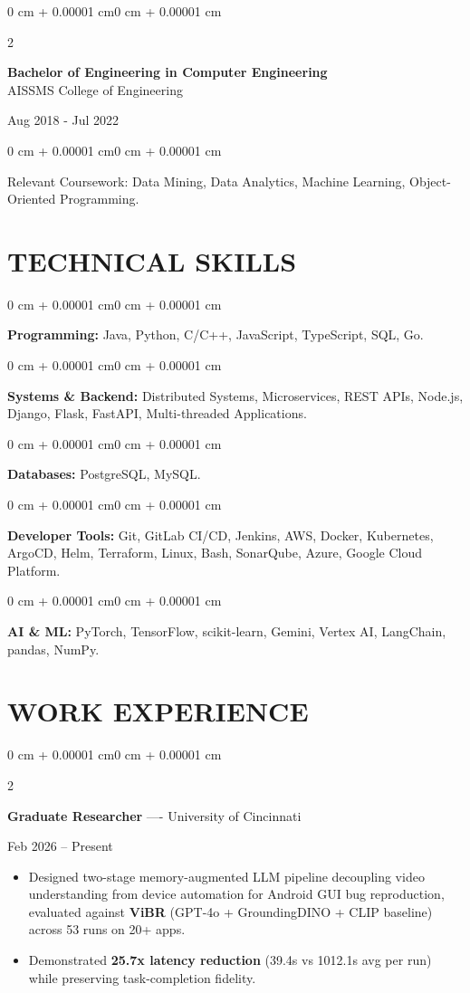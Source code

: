 \documentclass[10pt, letterpaper]{article}
\newenvironment{highlights}{
    \begin{itemize}[
        topsep=0.10 cm,
        parsep=0.06 cm,
        partopsep=0pt,
        itemsep=0.06 cm,
        leftmargin=12pt
    ]
}{
    \end{itemize}
}
\newenvironment{onecolentry}{
    \begin{adjustwidth}{0 cm + 0.00001 cm}{0 cm + 0.00001 cm}
}{
    \end{adjustwidth}
}
\newenvironment{twocolentry}[2][]{
    \onecolentry
    \def\secondColumn{#2}
    \setcolumnwidth{\fill, 4.5 cm}
    \begin{paracol}{2}
}{
    \switchcolumn \raggedleft \secondColumn
    \end{paracol}
    \endonecolentry
}
\begin{document}
\begin{twocolentry}{
    Aug 2018 - Jul 2022
}
    \textbf{Bachelor of Engineering in Computer Engineering} \\
    AISSMS College of Engineering
\end{twocolentry}
\begin{onecolentry}
Relevant Coursework: Data Mining, Data Analytics, Machine Learning, Object-Oriented Programming.
\end{onecolentry}
\section{TECHNICAL SKILLS}
\begin{onecolentry}
\textbf{Programming:} Java, Python, C/C++, JavaScript, TypeScript, SQL, Go.
\end{onecolentry}
\vspace{0.06 cm}
\begin{onecolentry}
\textbf{Systems \& Backend:} Distributed Systems, Microservices, REST APIs, Node.js, Django, Flask, FastAPI, Multi-threaded Applications.
\end{onecolentry}
\vspace{0.06 cm}
\begin{onecolentry}
\textbf{Databases:} PostgreSQL, MySQL.
\end{onecolentry}
\vspace{0.06 cm}
\begin{onecolentry}
\textbf{Developer Tools:} Git, GitLab CI/CD, Jenkins, AWS, Docker, Kubernetes, ArgoCD, Helm, Terraform, Linux, Bash, SonarQube, Azure, Google Cloud Platform.
\end{onecolentry}
\vspace{0.06 cm}
\begin{onecolentry}
\textbf{AI \& ML:} PyTorch, TensorFlow, scikit-learn, Gemini, Vertex AI, LangChain, pandas, NumPy.
\end{onecolentry}

\section{WORK EXPERIENCE}
\begin{twocolentry}{Feb 2026 -- Present}
\textbf{Graduate Researcher} ---- University of Cincinnati
\end{twocolentry}
\begin{highlights}
  \item Designed two-stage memory-augmented LLM pipeline decoupling video understanding from device automation for Android GUI bug reproduction, evaluated against \textbf{ViBR} (GPT-4o + GroundingDINO + CLIP baseline) across 53 runs on 20+ apps.
  \item Demonstrated \textbf{25.7x latency reduction} (39.4s vs 1012.1s avg per run) while preserving task-completion fidelity.
\end{highlights}
\end{document}
